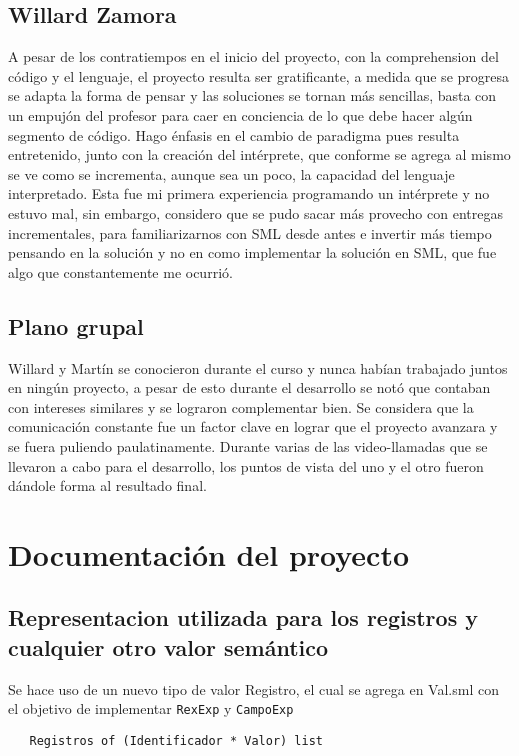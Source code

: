 \documentclass[12pt, times]{simauth}
\begin{document}
\subsection{Willard Zamora} 
A pesar de los contratiempos en el inicio del proyecto, con la comprehension del código y el lenguaje, el proyecto resulta ser gratificante, a medida que se progresa se adapta la forma de pensar y las soluciones se tornan más sencillas, basta con un empujón del profesor para caer en conciencia de lo que debe hacer algún segmento de código. Hago énfasis en el cambio de paradigma pues resulta entretenido, junto con la creación del intérprete, que conforme se agrega al mismo se ve como se incrementa, aunque sea un poco, la capacidad del lenguaje interpretado. Esta fue mi primera experiencia programando un intérprete y no estuvo mal, sin embargo, considero que se pudo sacar más provecho con entregas incrementales, para familiarizarnos con SML desde antes e invertir más tiempo pensando en la solución y no en como implementar la solución en SML, que fue algo que constantemente me ocurrió.

\subsection{Plano grupal}
Willard y Martín se conocieron durante el curso y nunca habían trabajado juntos en ningún proyecto, a pesar de esto durante el desarrollo se notó que contaban con intereses similares y se lograron complementar bien. Se considera que la comunicación constante fue un factor clave en lograr que el proyecto avanzara y se fuera puliendo paulatinamente. Durante varias de las video-llamadas que se llevaron a cabo para el desarrollo, los puntos de vista del uno y el otro fueron dándole forma al resultado final.

\section{Documentación del proyecto}

\subsection{Representacion utilizada para los registros y cualquier otro valor semántico}

Se hace uso de un nuevo tipo de valor Registro, el cual se agrega en Val.sml con el objetivo de implementar \texttt{RexExp} y \texttt{CampoExp}

\begin{verbatim}
   Registros of (Identificador * Valor) list
\end{verbatim}
\end{document}
